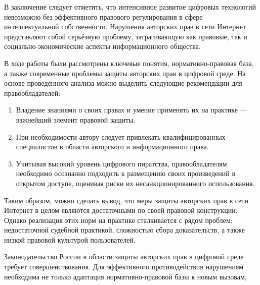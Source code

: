 \conclusion

В заключение следует отметить, что интенсивное развитие цифровых технологий невозможно
без эффективного правового регулирования в сфере интеллектуальной собственности.
Нарушения авторских прав в сети Интернет представляют собой серьёзную проблему,
затрагивающую как правовые, так и социально-экономические аспекты информационного
общества.

В ходе работы были рассмотрены ключевые понятия, нормативно-правовая база, а также
современные проблемы защиты авторских прав в цифровой среде. На основе проведённого
анализа можно выделить следующие рекомендации для правообладателей:

\begin{enumerate}
    \item Владение знаниями о своих правах и умение применять их на практике — важнейший
          элемент правовой защиты.
    \item При необходимости автору следует привлекать квалифицированных специалистов в
          области авторского и информационного права.
    \item Учитывая высокий уровень цифрового пиратства, правообладателям необходимо
          осознанно подходить к размещению своих произведений в открытом доступе,
          оценивая риски их несанкционированного использования.
\end{enumerate}

Таким образом, можно сделать вывод, что меры защиты авторских прав в сети Интернет в
целом являются достаточными по своей правовой конструкции. Однако реализация этих норм
на практике сталкивается с рядом проблем: недостаточной судебной практикой, сложностью
сбора доказательств, а также низкой правовой культурой пользователей.

Законодательство России в области защиты авторских прав в цифровой среде требует
совершенствования. Для эффективного противодействия нарушениям необходима не только
адаптация нормативно-правовой базы к новым вызовам,
